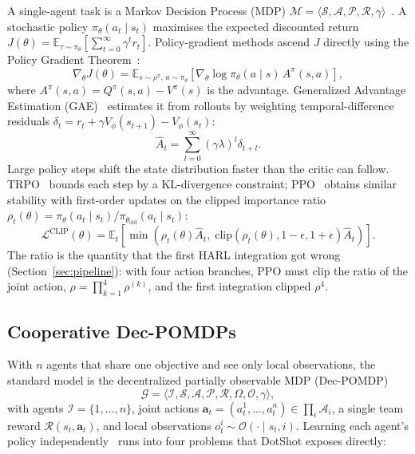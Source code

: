 \documentclass[11pt]{article}
\begin{document}
A single-agent task is a Markov Decision Process (MDP) $\mathcal{M} = \langle \mathcal{S}, \mathcal{A}, \mathcal{P}, \mathcal{R}, \gamma \rangle$~\cite{sutton2018rl}. A stochastic policy $\pi_\theta(a_t \mid s_t)$ maximises the expected discounted return $J(\theta) = \mathbb{E}_{\tau \sim \pi_\theta}\!\left[\sum_{t=0}^{\infty} \gamma^t r_t\right]$. Policy-gradient methods ascend $J$ directly using the Policy Gradient Theorem~\cite{sutton1999policy}:
\begin{equation}
\nabla_\theta J(\theta) = \mathbb{E}_{s \sim \rho^\pi, \, a \sim \pi_\theta}\!\left[ \nabla_\theta \log \pi_\theta(a \mid s) \, A^\pi(s, a) \right],
\end{equation}
where $A^\pi(s, a) = Q^\pi(s, a) - V^\pi(s)$ is the advantage. Generalized Advantage Estimation (GAE)~\cite{schulman2016gae} estimates it from rollouts by weighting temporal-difference residuals $\delta_t = r_t + \gamma V_\phi(s_{t+1}) - V_\phi(s_t)$:
\begin{equation}
\hat{A}_t = \sum_{l=0}^{\infty} (\gamma \lambda)^l \delta_{t+l}.
\end{equation}
Large policy steps shift the state distribution faster than the critic can follow. TRPO~\cite{schulman2015trpo} bounds each step by a KL-divergence constraint; PPO~\cite{schulman2017ppo} obtains similar stability with first-order updates on the clipped importance ratio $\rho_t(\theta) = \pi_\theta(a_t \mid s_t) / \pi_{\theta_{\text{old}}}(a_t \mid s_t)$:
\begin{equation}
\mathcal{L}^{\text{CLIP}}(\theta) = \mathbb{E}_t \!\left[ \min\!\left( \rho_t(\theta) \hat{A}_t, \; \text{clip}(\rho_t(\theta), 1 - \epsilon, 1 + \epsilon) \hat{A}_t \right) \right].
\end{equation}
The ratio is the quantity that the first HARL integration got wrong (Section~\ref{sec:pipeline}): with four action branches, PPO must clip the ratio of the joint action, $\rho = \prod_{k=1}^{4} \rho^{(k)}$, and the first integration clipped $\rho^4$.

\subsection{Cooperative Dec-POMDPs}

With $n$ agents that share one objective and see only local observations, the standard model is the decentralized partially observable MDP (Dec-POMDP)~\cite{bernstein2002complexity,oliehoek2016decpomdp}
\begin{equation}
\mathcal{G} = \langle \mathcal{I}, \mathcal{S}, \mathcal{A}, \mathcal{P}, \mathcal{R}, \Omega, \mathcal{O}, \gamma \rangle,
\end{equation}
with agents $\mathcal{I} = \{1, \dots, n\}$, joint actions $\mathbf{a}_t = (a_t^1, \dots, a_t^n) \in \prod_i \mathcal{A}_i$, a single team reward $\mathcal{R}(s_t, \mathbf{a}_t)$, and local observations $o_t^i \sim \mathcal{O}(\cdot \mid s_t, i)$. Learning each agent's policy independently~\cite{dewitt2020ippo} runs into four problems that DotShot exposes directly:
\end{document}
